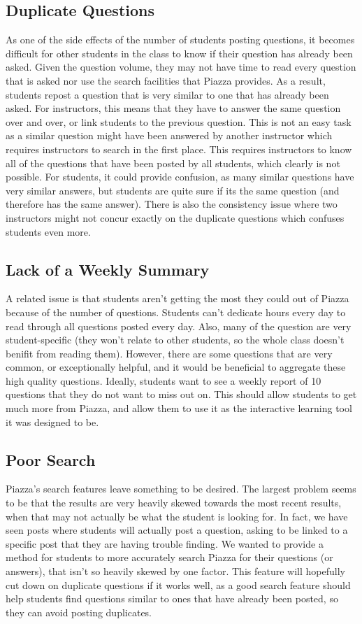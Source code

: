 \documentclass[sigconf]{acmart}
\begin{document}
\subsection{Duplicate Questions}
As one of the side effects of the number of students posting questions, it becomes difficult for other students in the class to know if their question has already been asked. Given the question volume, they may not have time to read every question that is asked nor use the search facilities that Piazza provides. As a result, students repost a question that is very similar to one that has already been asked. For instructors, this means that they have to answer the same question over and over, or link students to the previous question. This is not an easy task as a similar question might have been answered by another instructor which requires instructors to search in the first place. This requires instructors to know all of the questions that have been posted by all students, which clearly is not possible. For students, it could provide confusion, as many similar questions have very similar answers, but students are quite sure if its the same question (and therefore has the same answer). There is also the consistency issue where two instructors might not concur exactly on the duplicate questions which confuses students even more.

\subsection{Lack of a Weekly Summary}
A related issue is that students aren't getting the most they could out of Piazza because of the number of questions. Students can't dedicate hours every day to read through all questions posted every day. Also, many of the question are very student-specific (they won't relate to other students, so the whole class doesn't benifit from reading them). However, there are some questions that are very common, or exceptionally helpful, and it would be beneficial to aggregate these high quality questions. Ideally, students want to see a weekly report of 10 questions that they do not want to miss out on. This should allow students to get much more from Piazza, and allow them to use it as the interactive learning tool it was designed to be.

\subsection{Poor Search}
Piazza's search features leave something to be desired. The largest problem seems to be that the results are very heavily skewed towards the most recent results, when that may not actually be what the student is looking for. In fact, we have seen posts where students will actually post a question, asking to be linked to a specific post that they are having trouble finding. We wanted to provide a method for students to more accurately search Piazza for their questions (or answers), that isn't so heavily skewed by one factor. This feature will hopefully cut down on duplicate questions if it works well, as a good search feature should help students find questions similar to ones that have already been posted, so they can avoid posting duplicates.
\end{document}

